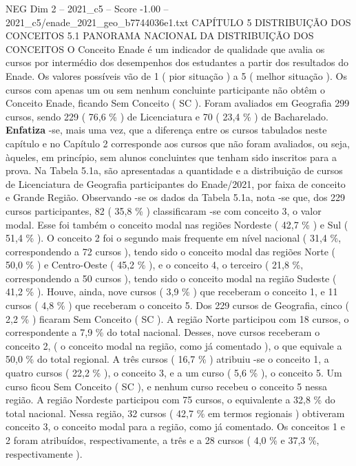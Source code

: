 \begin{textsample}{NEG Dim 2 – 2021\_c5 – Score -1.00 – 2021\_c5/enade\_2021\_geo\_b7744036e1.txt}  \label{ex:f2_neg_150}
CAPÍTULO 5 DISTRIBUIÇÃO DOS CONCEITOS 5.1 PANORAMA NACIONAL DA DISTRIBUIÇÃO DOS CONCEITOS O Conceito Enade é um indicador de qualidade que avalia os cursos por intermédio dos desempenhos dos estudantes a partir dos resultados do Enade.
Os valores possíveis vão de 1 ( pior situação ) a 5 ( melhor situação ).
Os cursos com apenas um ou sem nenhum concluinte participante não obtêm o Conceito Enade, ficando Sem Conceito ( SC ).
Foram avaliados em Geografia 299 cursos, sendo 229 ( 76,6 \% ) de Licenciatura e 70 ( 23,4 \% ) de Bacharelado. \textbf{Enfatiza} -se, mais uma vez, que a diferença entre os cursos tabulados neste capítulo e no Capítulo 2 corresponde aos cursos que não foram avaliados, ou seja, àqueles, em princípio, sem alunos concluintes que tenham sido inscritos para a prova.
Na Tabela 5.1a, são apresentadas a quantidade e a distribuição de cursos de Licenciatura de Geografia participantes do Enade/2021, por faixa de conceito e Grande Região.
Observando -se os dados da Tabela 5.1a, nota -se que, dos 229 cursos participantes, 82 ( 35,8 \% ) classificaram -se com conceito 3, o valor modal.
Esse foi também o conceito modal nas regiões Nordeste ( 42,7 \% ) e Sul ( 51,4 \% ).
O conceito 2 foi o segundo mais frequente em nível nacional ( 31,4 \%, correspondendo a 72 cursos ), tendo sido o conceito modal das regiões Norte ( 50,0 \% ) e Centro-Oeste ( 45,2 \% ), e o conceito 4, o terceiro ( 21,8 \%, correspondendo a 50 cursos ), tendo sido o conceito modal na região Sudeste ( 41,2 \% ).
Houve, ainda, nove cursos ( 3,9 \% ) que receberam o conceito 1, e 11 cursos ( 4,8 \% ) que receberam o conceito 5.
Dos 229 cursos de Geografia, cinco ( 2,2 \% ) ficaram Sem Conceito ( SC ).
A região Norte participou com 18 cursos, o correspondente a 7,9 \% do total nacional.
Desses, nove cursos receberam o conceito 2, ( o conceito modal na região, como já comentado ), o que equivale a 50,0 \% do total regional.
A três cursos ( 16,7 \% ) atribuiu -se o conceito 1, a quatro cursos ( 22,2 \% ), o conceito 3, e a um curso ( 5,6 \% ), o conceito 5.
Um curso ficou Sem Conceito ( SC ), e nenhum curso recebeu o conceito 5 nessa região.
A região Nordeste participou com 75 cursos, o equivalente a 32,8 \% do total nacional.
Nessa região, 32 cursos ( 42,7 \% em termos regionais ) obtiveram conceito 3, o conceito modal para a região, como já comentado.
Os conceitos 1 e 2 foram atribuídos, respectivamente, a três e a 28 cursos ( 4,0 \% e 37,3 \%, respectivamente ).

\end{textsample}
